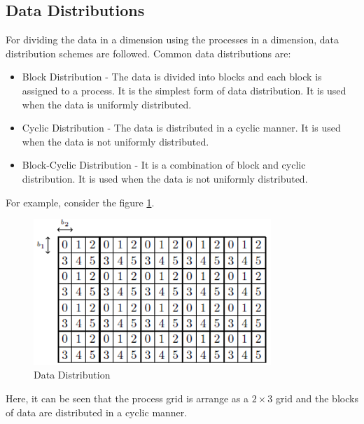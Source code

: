 \documentclass[12pt]{article}
\begin{document}
\subsection{Data Distributions}
For dividing the data in a dimension using the processes in a dimension, data distribution schemes are followed. 
Common data distributions are:
\begin{itemize}
    \item Block Distribution - The data is divided into blocks and each block is assigned to a process. It is the simplest form of data distribution. It is used when the data is uniformly distributed.
    \item Cyclic Distribution - The data is distributed in a cyclic manner. It is used when the data is not uniformly distributed.
    \item Block-Cyclic Distribution - It is a combination of block and cyclic distribution. It is used when the data is not uniformly distributed.
\end{itemize}
For example, consider the figure \ref{fig:data_distribution}. 
\begin{figure}[H]
    \centering
    \includegraphics[width=0.8\textwidth]{images/data_distribution.png}
    \caption{Data Distribution}
    \label{fig:data_distribution}
\end{figure}
Here, it can be seen that the process grid is arrange as a $2 \times 3$ grid and the blocks of data are distributed in a cyclic manner.
\end{document}
